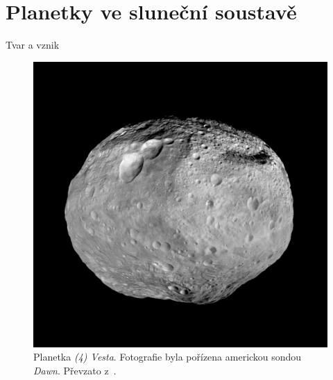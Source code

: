 \documentclass[xcolor=dvipsnames]{beamer}
\begin{document}
\section{Planetky ve sluneční soustavě}


\begin{frame}[t]{\secname}{Tvar a vznik}
	\begin{figure}
		\centering
		\includegraphics[height=0.65\textheight,width=\textwidth,keepaspectratio]{../obr/vesta.jpg}
		\caption{\footnotesize{Planetka \textit{(4) Vesta}. Fotografie byla pořízena americkou sondou \textit{Dawn}. Převzato z~\cite{jplvesta}.}}
	\end{figure}
\end{frame}
\end{document}
